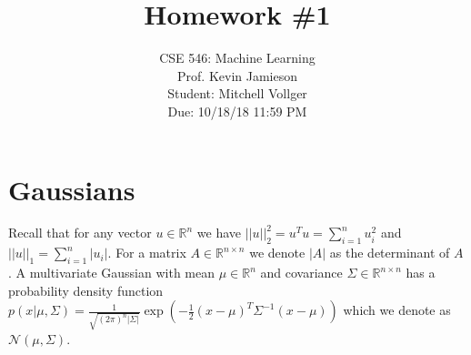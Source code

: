 \documentclass{article}
\date{{}}
\newcommand{\1}{\mathbf{1}}
\def\R{\mathbb{R}}
\begin{document}
\title{Homework \#1}
\author{\normalsize{CSE 546: Machine Learning}\\
\normalsize{Prof. Kevin Jamieson} \\
\normalsize{Student: Mitchell Vollger} \\
\normalsize{Due: 10/18/18  11:59 PM}}
\maketitle


\section{Gaussians}
Recall that for any vector $u \in \R^n$ we have $||u||_2^2 = u^T u = \sum_{i=1}^n u_i^2$ and $||u||_1 = \sum_{i=1}^n |u_i|$. 
For a matrix $A \in \R^{n \times n}$ we denote $|A|$ as the determinant of $A$.
A multivariate Gaussian with mean $\mu \in \R^n$ and covariance $\Sigma \in \R^{n \times n}$ has a probability density function $p(x| \mu, \Sigma) =  \frac{1}{\sqrt{(2\pi)^n |\Sigma|}} \exp( -\frac{1}{2} (x-\mu)^T \Sigma^{-1} (x-\mu) )$ which we denote as $\mathcal{N}(\mu,\Sigma)$. \\
\end{document}
